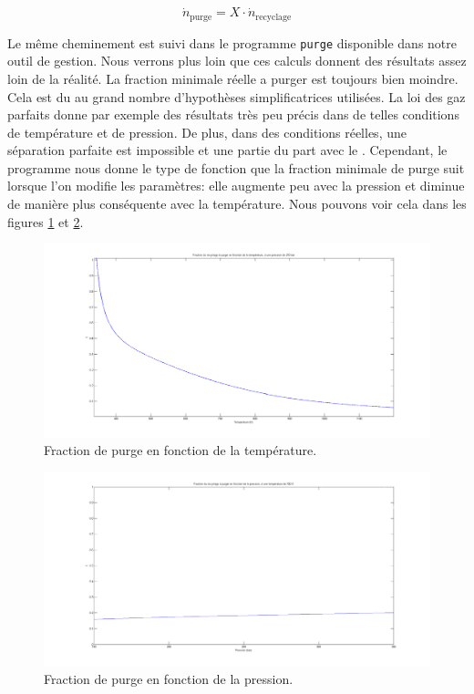 \begin{equation}
\dot{n}_{\text{purge}} = X \cdot \dot{n}_{\text{recyclage}}
\end{equation}

Le même cheminement est suivi dans le programme \texttt{purge} 
disponible dans notre outil de gestion. Nous verrons plus loin que ces calculs donnent
des résultats assez loin de la réalité. La fraction minimale réelle a purger est toujours
bien moindre. Cela est du au grand nombre d'hypothèses simplificatrices utilisées. 
La loi des gaz parfaits donne par exemple des résultats très peu précis 
dans de telles conditions de température et de pression. 
De plus, dans des conditions réelles, une séparation parfaite est impossible 
et une partie du  part avec le .
Cependant, le programme nous donne le type de fonction que la fraction minimale de purge
suit lorsque l'on modifie les paramètres: elle augmente peu avec la pression et diminue
de manière plus conséquente avec la température. Nous pouvons voir cela dans les figures
\ref{fig:purge1} et \ref{fig:purge2}.

\begin{figure}[h!]
	\begin{center}
		\includegraphics[scale=0.3]{../tache2/img/purge1.png}
	\end{center}
	\caption{Fraction de purge en fonction de la température.}
	\label{fig:purge1}
\end{figure}

\begin{figure}[h!]
	\begin{center}
		\includegraphics[scale=0.3]{../tache2/img/purge2.png}
	\end{center}
	\caption{Fraction de purge en fonction de la pression.}
	\label{fig:purge2}
\end{figure}


